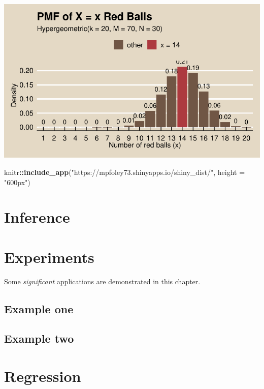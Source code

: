 \documentclass[]{book}
\newenvironment{Shaded}{\begin{snugshade}}{\end{snugshade}}
\newcommand{\DataTypeTok}[1]{\textcolor[rgb]{0.13,0.29,0.53}{#1}}
\newcommand{\KeywordTok}[1]{\textcolor[rgb]{0.13,0.29,0.53}{\textbf{#1}}}
\newcommand{\NormalTok}[1]{#1}
\newcommand{\OperatorTok}[1]{\textcolor[rgb]{0.81,0.36,0.00}{\textbf{#1}}}
\newcommand{\StringTok}[1]{\textcolor[rgb]{0.31,0.60,0.02}{#1}}
\begin{document}
\includegraphics{data-sci_files/figure-latex/unnamed-chunk-19-1.pdf}

\begin{Shaded}
\begin{Highlighting}[]
\NormalTok{knitr}\OperatorTok{::}\KeywordTok{include_app}\NormalTok{(}\StringTok{"https://mpfoley73.shinyapps.io/shiny_dist/"}\NormalTok{, }
  \DataTypeTok{height =} \StringTok{"600px"}\NormalTok{)}
\end{Highlighting}
\end{Shaded}

\hypertarget{inference}{%
\chapter{Inference}\label{inference}}

\hypertarget{experiments}{%
\chapter{Experiments}\label{experiments}}

Some \emph{significant} applications are demonstrated in this chapter.

\hypertarget{example-one}{%
\section{Example one}\label{example-one}}

\hypertarget{example-two}{%
\section{Example two}\label{example-two}}

\hypertarget{regression}{%
\chapter{Regression}\label{regression}}
\end{document}
